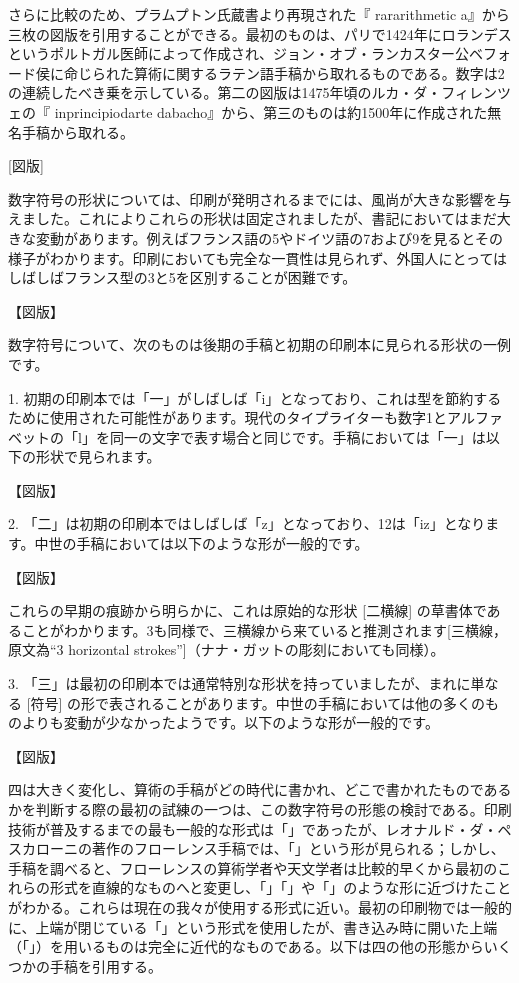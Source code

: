 \documentclass[a4paper,11pt,openany]{ltjsbook}
\begin{document}
さらに比較のため、プラムプトン氏蔵書より再現された『 rararithmetic a』から三枚の図版を引用することができる。最初のものは、パリで1424年にロランデスというポルトガル医師によって作成され、ジョン・オブ・ランカスター公ベフォード侯に命じられた算術に関するラテン語手稿から取れるものである。数字は2の連続したべき乗を示している。第二の図版は1475年頃のルカ・ダ・フィレンツェの『 inprincipiodarte dabacho』から、第三のものは約1500年に作成された無名手稿から取れる。

[図版]

数字符号の形状については、印刷が発明されるまでには、風尚が大きな影響を与えました。これによりこれらの形状は固定されましたが、書記においてはまだ大きな変動があります。例えばフランス語の5やドイツ語の7および9を見るとその様子がわかります。印刷においても完全な一貫性は見られず、外国人にとってはしばしばフランス型の3と5を区別することが困難です。

【図版】

数字符号について、次のものは後期の手稿と初期の印刷本に見られる形状の一例です。

1. 初期の印刷本では「一」がしばしば「i」となっており、これは型を節約するために使用された可能性があります。現代のタイプライターも数字1とアルファベットの「l」を同一の文字で表す場合と同じです。手稿においては「一」は以下の形状で見られます。

【図版】

2. 「二」は初期の印刷本ではしばしば「z」となっており、12は「iz」となります。中世の手稿においては以下のような形が一般的です。

【図版】

これらの早期の痕跡から明らかに、これは原始的な形状 [二横線] の草書体であることがわかります。3も同様で、三横線から来ていると推測されます[三横線，原文為“3 horizontal strokes”]（ナナ・ガットの彫刻においても同様）。

3. 「三」は最初の印刷本では通常特別な形状を持っていましたが、まれに単なる [符号] の形で表されることがあります。中世の手稿においては他の多くのものよりも変動が少なかったようです。以下のような形が一般的です。

【図版】

四は大きく変化し、算術の手稿がどの時代に書かれ、どこで書かれたものであるかを判断する際の最初の試練の一つは、この数字符号の形態の検討である。印刷技術が普及するまでの最も一般的な形式は「」であったが、レオナルド・ダ・ペスカローニの著作のフローレンス手稿では、「」という形が見られる；しかし、手稿を調べると、フローレンスの算術学者や天文学者は比較的早くから最初のこれらの形式を直線的なものへと変更し、「」「」や「」のような形に近づけたことがわかる。これらは現在の我々が使用する形式に近い。最初の印刷物では一般的に、上端が閉じている「」という形式を使用したが、書き込み時に開いた上端（「」）を用いるものは完全に近代的なものである。以下は四の他の形態からいくつかの手稿を引用する。
\end{document}
